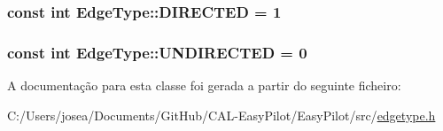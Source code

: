 \subsubsection[{D\+I\+R\+E\+C\+T\+E\+D}]{\setlength{\rightskip}{0pt plus 5cm}const int Edge\+Type\+::\+D\+I\+R\+E\+C\+T\+E\+D = 1\hspace{0.3cm}{\ttfamily [static]}}\label{class_edge_type_a903017a534f2818c2d17145e4ae0321c}
\hypertarget{class_edge_type_a6533cc56d05c288a550b9980b66c9317}{}
\subsubsection[{U\+N\+D\+I\+R\+E\+C\+T\+E\+D}]{\setlength{\rightskip}{0pt plus 5cm}const int Edge\+Type\+::\+U\+N\+D\+I\+R\+E\+C\+T\+E\+D = 0\hspace{0.3cm}{\ttfamily [static]}}\label{class_edge_type_a6533cc56d05c288a550b9980b66c9317}


A documentação para esta classe foi gerada a partir do seguinte ficheiro\+:\begin{DoxyCompactItemize}
\item 
C\+:/\+Users/josea/\+Documents/\+Git\+Hub/\+C\+A\+L-\/\+Easy\+Pilot/\+Easy\+Pilot/src/\hyperlink{edgetype_8h}{edgetype.\+h}\end{DoxyCompactItemize}

